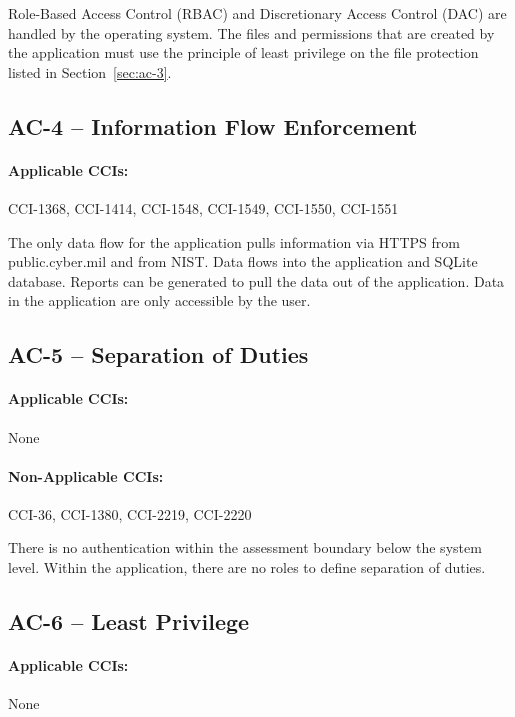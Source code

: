 \documentclass[letterpaper, 10pt, twoside]{article}
\begin{document}
Role-Based Access Control (RBAC) and Discretionary Access Control (DAC) are handled by the operating system. The files and permissions that are created by the application must use the principle of least privilege on the file protection listed in Section~\ref{sec:ac-3}.

\subsection{AC-4 -- Information Flow Enforcement}

\paragraph{Applicable CCIs:} CCI-1368, CCI-1414, CCI-1548, CCI-1549, CCI-1550, CCI-1551

The only data flow for the application pulls information via HTTPS from public.cyber.mil and from NIST. Data flows into the application and SQLite database. Reports can be generated to pull the data out of the application. Data in the application are only accessible by the user.

\subsection{AC-5 -- Separation of Duties}

\paragraph{Applicable CCIs:} None

\paragraph{Non-Applicable CCIs:} CCI-36, CCI-1380, CCI-2219, CCI-2220

There is no authentication within the assessment boundary below the system level. Within the application, there are no roles to define separation of duties.

\subsection{AC-6 -- Least Privilege}
\label{sec:ac-6}

\paragraph{Applicable CCIs:} None
\end{document}
